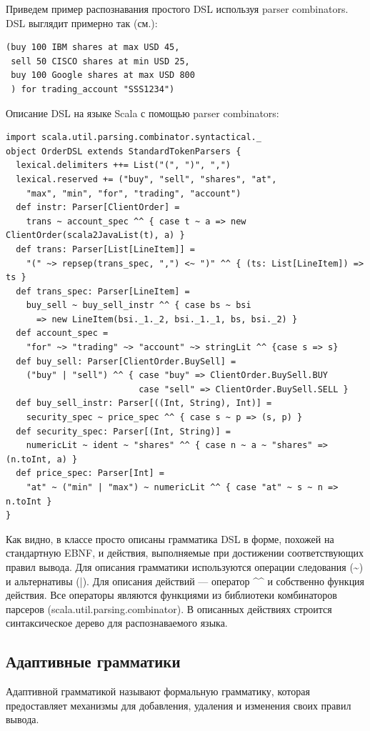\documentclass[a4paper,12pt,titlepage]{extarticle}
\begin{document}
Приведем пример распознавания простого DSL используя parser combinators.
DSL выглядит примерно так (см.\cite{scalapc}):
\begin{verbatim} 
(buy 100 IBM shares at max USD 45,
 sell 50 CISCO shares at min USD 25,
 buy 100 Google shares at max USD 800
 ) for trading_account "SSS1234")
\end{verbatim}
Описание DSL на языке Scala с помощью parser combinators:
\begin{verbatim} 
import scala.util.parsing.combinator.syntactical._
object OrderDSL extends StandardTokenParsers {
  lexical.delimiters ++= List("(", ")", ",")
  lexical.reserved += ("buy", "sell", "shares", "at", 
    "max", "min", "for", "trading", "account")
  def instr: Parser[ClientOrder] =
    trans ~ account_spec ^^ { case t ~ a => new ClientOrder(scala2JavaList(t), a) }
  def trans: Parser[List[LineItem]] =
    "(" ~> repsep(trans_spec, ",") <~ ")" ^^ { (ts: List[LineItem]) => ts }
  def trans_spec: Parser[LineItem] =
    buy_sell ~ buy_sell_instr ^^ { case bs ~ bsi 
      => new LineItem(bsi._1._2, bsi._1._1, bs, bsi._2) }
  def account_spec =
    "for" ~> "trading" ~> "account" ~> stringLit ^^ {case s => s}
  def buy_sell: Parser[ClientOrder.BuySell] =
    ("buy" | "sell") ^^ { case "buy" => ClientOrder.BuySell.BUY
                          case "sell" => ClientOrder.BuySell.SELL }
  def buy_sell_instr: Parser[((Int, String), Int)] =
    security_spec ~ price_spec ^^ { case s ~ p => (s, p) }
  def security_spec: Parser[(Int, String)] =
    numericLit ~ ident ~ "shares" ^^ { case n ~ a ~ "shares" => (n.toInt, a) }
  def price_spec: Parser[Int] =
    "at" ~ ("min" | "max") ~ numericLit ^^ { case "at" ~ s ~ n => n.toInt }
}
\end{verbatim}
Как видно, в классе просто описаны грамматика DSL в форме, похожей на
стандартную EBNF, и действия, выполняемые при достижении соответствующих
правил вывода.
Для описания грамматики используются операции следования (\~{}) и альтернативы
(|). Для описания действий --- оператор \^{}\^{} и собственно функция действия.
Все операторы являются функциями из библиотеки комбинаторов парсеров
(scala.util.parsing.combinator).
В описанных действиях строится синтаксическое дерево для распознаваемого языка.

\subsection{Адаптивные грамматики}
\label{adaptive}
Адаптивной грамматикой называют формальную грамматику, которая предоставляет
механизмы для добавления, удаления и изменения своих правил вывода.
\end{document}

